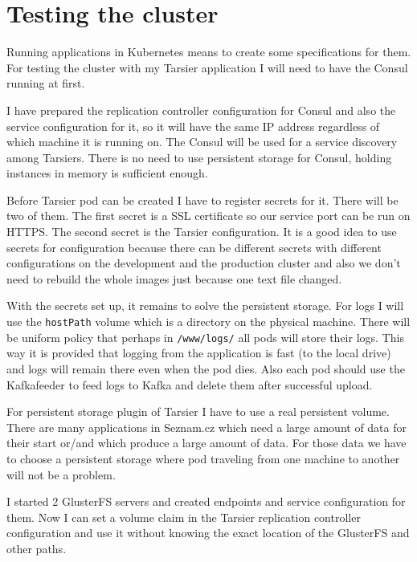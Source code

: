 \chapter{Testing the cluster}

Running applications in Kubernetes means to create some specifications for them. For testing the cluster with my Tarsier application I will need to have the Consul running at first.

I have prepared the replication controller configuration for Consul and also the service configuration for it, so it will have the same IP address regardless of which machine it is running on. The Consul will be used for a service discovery among Tarsiers. There is no need to use persistent storage for Consul, holding instances in memory is sufficient enough.

Before Tarsier pod can be created I have to register secrets for it. There will be two of them. The first secret is a SSL certificate so our service port can be run on HTTPS. The second secret is the Tarsier configuration. It is a good idea to use secrets for configuration because there can be different secrets with different configurations on the development and the production cluster and also we don’t need to rebuild the whole images just because one text file changed.

With the secrets set up, it remains to solve the persistent storage. For logs I will use the \lstinline{hostPath} volume which is a directory on the physical machine. There will be uniform policy that perhaps in \lstinline{/www/logs/} all pods will store their logs. This way it is provided that logging from the application is fast (to the local drive) and logs will remain there even when the pod dies. Also each pod should use the Kafkafeeder to feed logs to Kafka and delete them after successful upload.
 
For persistent storage plugin of Tarsier I have to use a real persistent volume. There are many applications in Seznam.cz which need a large amount of data for their start or/and which produce a large amount of data. For those data we have to choose a persistent storage where pod traveling from one machine to another will not be a problem.

I started 2 GlusterFS \cite{glusterfs} servers and created endpoints and service configuration for them. Now I can set a volume claim in the Tarsier replication controller configuration and use it without knowing the exact location of the GlusterFS and other paths.

